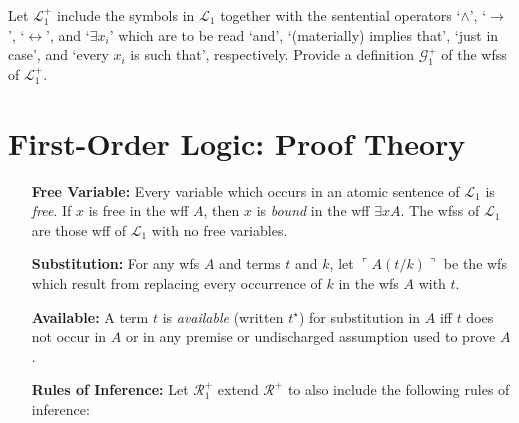 \documentclass[a4paper, 11pt]{article} %
\newcommand{\corner}[1]{\ulcorner#1\urcorner} %
\renewcommand{\L}[0]{\mathcal{L}}
\begin{document}
Let $\L_1^+$ include the symbols in $\L_1$ together with the sentential operators `$\wedge$', `$\rightarrow$', `$\leftrightarrow$', and `$\exists x_i$' which are to be read `and', `(materially) implies that', `just in case', and `every $x_i$ is such that', respectively. Provide a definition $\mathcal{G}_1^+$ of the wfss of $\L_1^+$.




\section*{\sc First-Order Logic: Proof Theory}

\begin{enumerate}[leftmargin=1.2in,labelsep=.15in] %
\item[\bf Free Variable:] Every variable which occurs in an atomic sentence of $\L_1$ is \textit{free}. If $x$ is free in the wff $A$, then $x$ is \textit{bound} in the wff $\exists xA$. The wfss of $\L_1$ are those wff of $\L_1$ with no free variables.
\item[\bf Substitution:] For any wfs ${A}$ and terms $t$ and $k$, let $\corner{A(t/k)}$ be the wfs which result from replacing every occurrence of $k$ in the wfs ${A}$ with $t$.
\item[\bf Available:] A term $t$ is \textit{available} (written $t^\star$) for substitution in ${A}$ iff $t$ does not occur in ${A}$ or in any premise or undischarged assumption used to prove $A$.
\item[\bf Rules of Inference:] Let $\mathcal{R}_1^+$ extend $\mathcal{R}^+$ to also include the following rules of inference:%
\end{enumerate}
\end{document}
